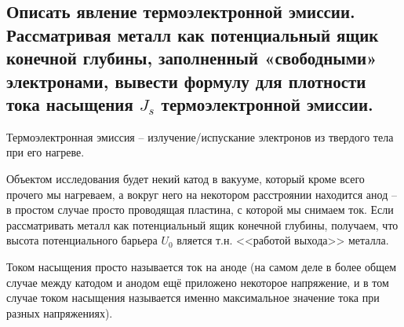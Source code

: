 \subsection{Описать явление термоэлектронной эмиссии. Рассматривая металл как потенциальный
ящик конечной глубины, заполненный «свободными» электронами, вывести формулу для плотности
тока насыщения $J_s$ термоэлектронной эмиссии.}

Термоэлектронная эмиссия -- излучение/испускание электронов из твердого тела при его нагреве.

Объектом исследования будет некий катод в вакууме, который кроме всего прочего мы нагреваем,
а вокруг него на некотором расстроянии находится анод -- в простом случае просто проводящая
пластина, с которой мы снимаем ток. Если рассматривать металл как потенциальный ящик конечной
глубины, получаем, что высота потенциального барьера $U_0$ вляется т.н. <<работой выхода>>
металла.

Током насыщения просто называется ток на аноде (на самом деле в более общем случае между 
катодом и анодом ещё приложено некоторое напряжение, и в том случае током насыщения называется
именно максимальное значение тока при разных напряжениях).

